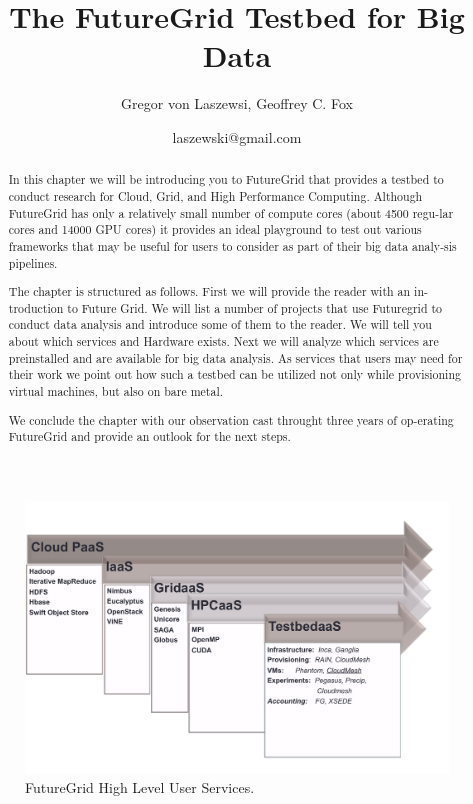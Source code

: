 \documentclass{article}
\begin{document}
\title{The FutureGrid Testbed for Big Data}
\author{Gregor von Laszewsi, Geoffrey C. Fox}
\date{laszewski@gmail.com}

\maketitle

\begin{abstract}

In this chapter we will be introducing you to FutureGrid that provides a testbed to conduct research for Cloud, Grid, and High Performance Computing. Although FutureGrid has only a relatively small number of compute cores (about 4500 regu-lar cores and 14000 GPU cores) it provides an ideal playground to test out various frameworks that may be useful for users to consider as part of their big data analy-sis pipelines. 

The chapter is structured as follows. First we will provide the reader with an in-troduction to Future Grid. We will list a number of projects that use Futuregrid to conduct data analysis and introduce some of them to the reader. We will tell you about which services and Hardware exists. Next we will analyze which services are preinstalled and are available for big data analysis. As services that users may need for their work we point out how such a testbed can be utilized not only while provisioning virtual machines, but also on bare metal. 

We conclude the chapter with our observation cast throught three years of op-erating FutureGrid and provide an outlook for the next steps.
\end{abstract}


\begin{figure}[h!]
  \caption{FutureGrid High Level User Services.}
  \centering
    \includegraphics[width=1.0\textwidth]{images/user-services}
\end{figure}
\end{document}
